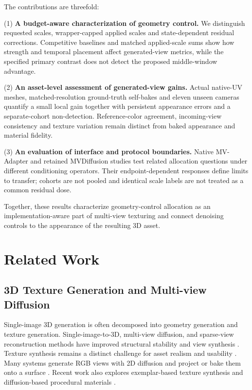 \documentclass[times,twocolumn,final]{elsarticle}
\begin{document}
The contributions are threefold:

(1) \textbf{A budget-aware characterization of geometry control.} We distinguish requested scales, wrapper-capped applied scales and state-dependent residual corrections. Competitive baselines and matched applied-scale sums show how strength and temporal placement affect generated-view metrics, while the specified primary contrast does not detect the proposed middle-window advantage.

(2) \textbf{An asset-level assessment of generated-view gains.} Actual native-UV meshes, matched-resolution ground-truth self-bakes and eleven unseen cameras quantify a small local gain together with persistent appearance errors and a separate-cohort non-detection. Reference-color agreement, incoming-view consistency and texture variation remain distinct from baked appearance and material fidelity.

(3) \textbf{An evaluation of interface and protocol boundaries.} Native MV-Adapter and retained MVDiffusion studies test related allocation questions under different conditioning operators. Their endpoint-dependent responses define limits to transfer; cohorts are not pooled and identical scale labels are not treated as a common residual dose.

Together, these results characterize geometry-control allocation as an implementation-aware part of multi-view texturing and connect denoising controls to the appearance of the resulting 3D asset.

\section{Related Work}
\label{sec:related}

\subsection{3D Texture Generation and Multi-view Diffusion}
\label{subsec:3dtex}

Single-image 3D generation is often decomposed into geometry generation and texture generation. Single-image-to-3D, multi-view diffusion, and sparse-view reconstruction methods have improved structural stability and view synthesis \cite{liu2023zero1to3,shi2023zero123pp,liu2023syncdreamer,long2023wonder3d,shi2024mvdream,wang2023imagedream,xu2024instantmesh,ke2024era3d}. Texture synthesis remains a distinct challenge for asset realism and usability \cite{perla2026survey}. Many systems generate RGB views with 2D diffusion and project or bake them onto a surface \cite{chen2023text2tex,richardson2023texture,poole2023dreamfusion,chen2023fantasia3d}. Recent work also explores exemplar-based texture synthesis and diffusion-based procedural materials \cite{guzman2026adaptive,lv2025interpretable}.
\end{document}
